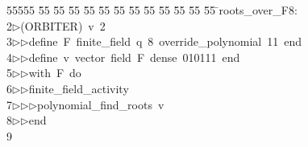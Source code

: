 %
%
\begin{tabbing}
55555 \= 55 \= 55 \= 55 \= 55 \= 55 \= 55 \= 55 \= 55 \= 55 \= 55 \= 55 \= 55 \= \>roots\_over\_F8:\\[0pt]
2\>$\triangleright$\>(ORBITER)\ v\ 2\ \\[0pt]
3\>$\triangleright$\>$\triangleright$\>define\ F\ finite\_field\ q\ 8\ override\_polynomial\ 11\ end\ \\[0pt]
4\>$\triangleright$\>$\triangleright$\>define\ v\ vector\ field\ F\ dense\ 010111\ end\ \\[0pt]
5\>$\triangleright$\>$\triangleright$\>with\ F\ do\ \\[0pt]
6\>$\triangleright$\>$\triangleright$\>finite\_field\_activity\ \\[0pt]
7\>$\triangleright$\>$\triangleright$\>$\triangleright$\>polynomial\_find\_roots\ v\ \\[0pt]
8\>$\triangleright$\>$\triangleright$\>end\\[0pt]
9\>\end{tabbing}
